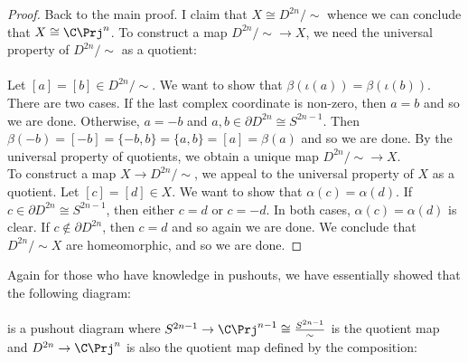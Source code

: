 \documentclass[a4paper]{article}
\begin{document}
\begin{prp}{}{}
\begin{proof}
Back to the main proof. I claim that $X\cong D^{2n}/\sim$ whence we can conclude that $X\cong\C\Prj^n$. To construct a map $D^{2n}/\sim\to X$, we need the universal property of $D^{2n}/\sim$ as a quotient: \\
\\
Let $[a]=[b]\in D^{2n}/\sim$. We want to show that $\beta(\iota(a))=\beta(\iota(b))$. There are two cases. If the last complex coordinate is non-zero, then $a=b$ and so we are done. Otherwise, $a=-b$ and $a,b\in\partial D^{2n}\cong S^{2n-1}$. Then $\beta(-b)=[-b]=\{-b,b\}=\{a,b\}=[a]=\beta(a)$ and so we are done. By the universal property of quotients, we obtain a unique map $D^{2n}/\sim\to X$. \\

To construct a map $X\to D^{2n}/\sim$, we appeal to the universal property of $X$ as a quotient. Let $[c]=[d]\in X$. We want to show that $\alpha(c)=\alpha(d)$. If $c\in\partial D^{2n}\cong S^{2n-1}$, then either $c=d$ or $c=-d$. In both cases, $\alpha(c)=\alpha(d)$ is clear. If $c\notin\partial D^{2n}$, then $c=d$ and so again we are done. We conclude that $D^{2n}/\sim X$ are homeomorphic, and so we are done. 
\end{proof}
\end{prp}

Again for those who have knowledge in pushouts, we have essentially showed that the following diagram: \\
\\
is a pushout diagram where $S^{2n-1}\to\C\Prj^{n-1}\cong\frac{S^{2n-1}}{\sim}$ is the quotient map and $D^{2n}\to\C\Prj^n$ is also the quotient map defined by the composition: \\
\\
\end{document}
